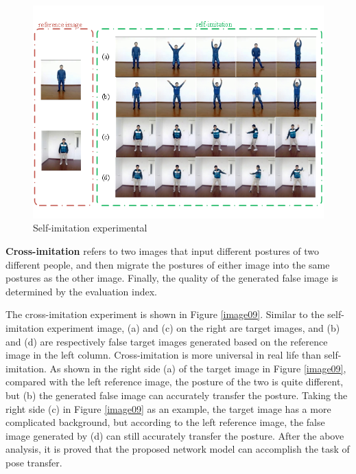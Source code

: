 	\begin{figure}
		\centering
		\includegraphics[scale=1]{image08.png}
		\caption{Self-imitation experimental}
		\label{image08}
	\end{figure}

\textbf{Cross-imitation} refers to two images that input different postures of two different people, and then migrate the postures of either image into the same postures as the other image. Finally, the quality of the generated false image is determined by the evaluation index.
	
The cross-imitation experiment is shown in Figure \ref{image09}. Similar to the self-imitation experiment image, (a) and (c) on the right are target images, and (b) and (d) are respectively false target images generated based on the reference image in the left column. Cross-imitation is more universal in real life than self-imitation. As shown in the right side (a) of the target image in Figure \ref{image09}, compared with the left reference image, the posture of the two is quite different, but (b) the generated false image can accurately transfer the posture. Taking the right side (c) in Figure \ref{image09} as an example, the target image has a more complicated background, but according to the left reference image, the false image generated by (d) can still accurately transfer the posture. After the above analysis, it is proved that the proposed network model can accomplish the task of pose transfer.
	
